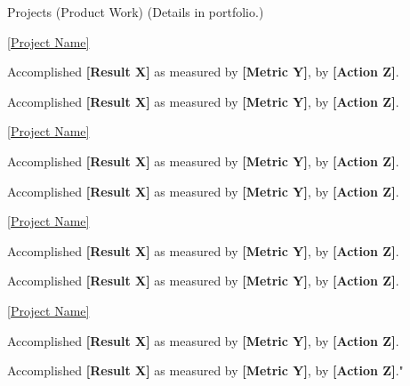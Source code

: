 \documentclass{resume} %
\begin{document}
\begin{rSection}{Projects (Product Work) {\fontsize{8}{9}\selectfont (Details in portfolio.)}\vspace{.2em}}
\begin{rSubsection}{\href{[Project URL]}{[Project Name]}}{}{}{}
\begin{itemize}[left=-1.5em, labelsep=.1cm, labelwidth=.2cm, itemsep=0.0em]
{\item Accomplished \textbf{[Result X]} as measured by \textbf{[Metric Y]}, by \textbf{[Action Z]}.}
{\item Accomplished \textbf{[Result X]} as measured by \textbf{[Metric Y]}, by \textbf{[Action Z]}.
}
\end{itemize}

\end{rSubsection}
\begin{rSubsection}{\href{[Project URL]}{[Project Name]}}{}{}{}
\begin{itemize}[left=-1.5em, labelsep=.1cm, labelwidth=.2cm, itemsep=0.0em]
{\item Accomplished \textbf{[Result X]} as measured by \textbf{[Metric Y]}, by \textbf{[Action Z]}.}
{\item Accomplished \textbf{[Result X]} as measured by \textbf{[Metric Y]}, by \textbf{[Action Z]}.}
\end{itemize}

\end{rSubsection}
\begin{rSubsection}{\href{[Project URL]}{[Project Name]}}{}{}{}
\begin{itemize}[left=-1.5em, labelsep=.1cm, labelwidth=.2cm, itemsep=0.0em]
{\item Accomplished \textbf{[Result X]} as measured by \textbf{[Metric Y]}, by \textbf{[Action Z]}.}
{\item Accomplished \textbf{[Result X]} as measured by \textbf{[Metric Y]}, by \textbf{[Action Z]}.}
\end{itemize}
\end{rSubsection}
\begin{rSubsection}{\href{[Project URL]}{[Project Name]}}{}{}{}
\begin{itemize}[left=-1.5em, labelsep=.1cm, labelwidth=.2cm, itemsep=0.0em]
{\item Accomplished \textbf{[Result X]} as measured by \textbf{[Metric Y]}, by \textbf{[Action Z]}.}
{\item Accomplished \textbf{[Result X]} as measured by \textbf{[Metric Y]}, by \textbf{[Action Z]}."}
\end{itemize}
\end{rSubsection}

\vspace{0.25 em}
\end{rSection}
\end{document}
